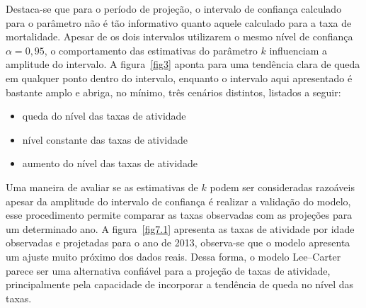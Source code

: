 \documentclass[12pt, 						%
			openright, 					%
			twoside,					%
			a4paper,x					%
			english,					%
			brazil]{abntex2}				%
\begin{document}
	Destaca-se que para o período de projeção, o intervalo de confiança calculado para o parâmetro não é tão informativo quanto aquele calculado para a taxa de mortalidade. Apesar de os dois intervalos utilizarem o mesmo nível de confiança $\alpha = 0,95$, o comportamento das estimativas do parâmetro $k$ influenciam a amplitude do intervalo. A figura~\ref{fig3} aponta para uma tendência clara de queda em qualquer ponto dentro do intervalo, enquanto o intervalo aqui apresentado é bastante amplo e abriga, no mínimo, três cenários distintos, listados a seguir:
	\begin{itemize}
		\item{queda do nível das taxas de atividade}
		\item{nível constante das taxas de atividade}
		\item{aumento do nível das taxas de atividade}
	\end{itemize}
	Uma maneira de avaliar se as estimativas de $k$ podem ser consideradas razoáveis apesar da amplitude do intervalo de confiança é realizar a validação do modelo, esse procedimento permite comparar as taxas observadas com as projeções para um determinado ano. A figura~\ref{fig7.1} apresenta as taxas de atividade por idade observadas e projetadas para o ano de 2013, observa-se que o modelo apresenta um ajuste muito próximo dos dados reais. Dessa forma, o modelo Lee--Carter parece ser uma alternativa confiável para a projeção de taxas de atividade, principalmente pela capacidade de incorporar a tendência de queda no nível das taxas. \\
\end{document}
